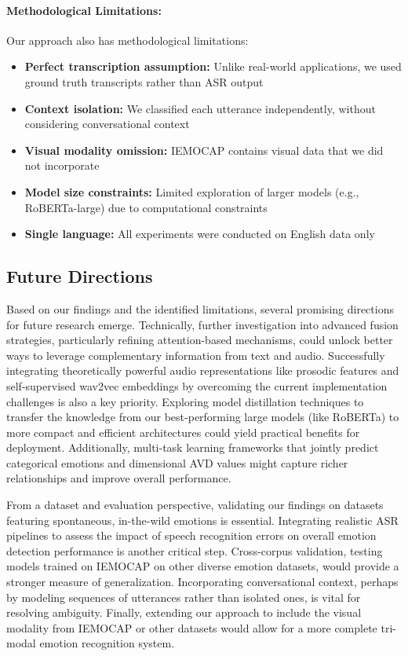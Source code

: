 \documentclass[12pt]{article}
\begin{document}
\paragraph{Methodological Limitations:}
Our approach also has methodological limitations:

\begin{itemize}
    \item \textbf{Perfect transcription assumption:} Unlike real-world applications, we used ground truth transcripts rather than ASR output

    \item \textbf{Context isolation:} We classified each utterance independently, without considering conversational context

    \item \textbf{Visual modality omission:} IEMOCAP contains visual data that we did not incorporate

    \item \textbf{Model size constraints:} Limited exploration of larger models (e.g., RoBERTa-large) due to computational constraints

    \item \textbf{Single language:} All experiments were conducted on English data only
\end{itemize}

\subsection{Future Directions}
Based on our findings and the identified limitations, several promising directions for future research emerge. Technically, further investigation into advanced fusion strategies, particularly refining attention-based mechanisms, could unlock better ways to leverage complementary information from text and audio. Successfully integrating theoretically powerful audio representations like prosodic features and self-supervised wav2vec embeddings by overcoming the current implementation challenges is also a key priority. Exploring model distillation techniques to transfer the knowledge from our best-performing large models (like RoBERTa) to more compact and efficient architectures could yield practical benefits for deployment. Additionally, multi-task learning frameworks that jointly predict categorical emotions and dimensional AVD values might capture richer relationships and improve overall performance.

From a dataset and evaluation perspective, validating our findings on datasets featuring spontaneous, in-the-wild emotions is essential. Integrating realistic ASR pipelines to assess the impact of speech recognition errors on overall emotion detection performance is another critical step. Cross-corpus validation, testing models trained on IEMOCAP on other diverse emotion datasets, would provide a stronger measure of generalization. Incorporating conversational context, perhaps by modeling sequences of utterances rather than isolated ones, is vital for resolving ambiguity. Finally, extending our approach to include the visual modality from IEMOCAP or other datasets would allow for a more complete tri-modal emotion recognition system.
\end{document}
